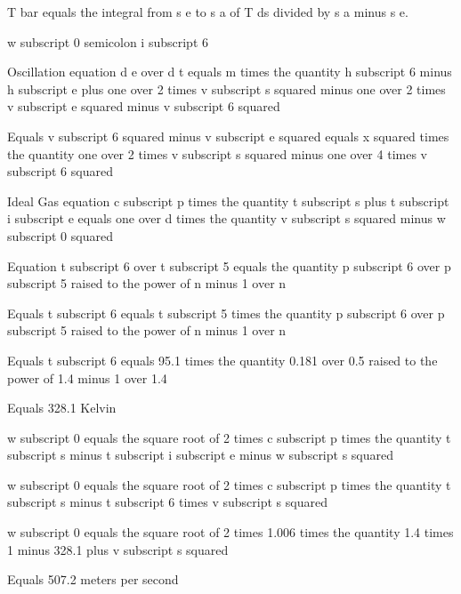 T bar equals the integral from s e to s a of T ds divided by s a minus s e.

w subscript 0 semicolon i subscript 6  

Oscillation equation  
d e over d t equals m times the quantity h subscript 6 minus h subscript e plus one over 2 times v subscript s squared minus one over 2 times v subscript e squared minus v subscript 6 squared  

Equals  
v subscript 6 squared minus v subscript e squared equals x squared times the quantity one over 2 times v subscript s squared minus one over 4 times v subscript 6 squared  

Ideal Gas equation  
c subscript p times the quantity t subscript s plus t subscript i subscript e equals one over d times the quantity v subscript s squared minus w subscript 0 squared  

Equation  
t subscript 6 over t subscript 5 equals the quantity p subscript 6 over p subscript 5 raised to the power of n minus 1 over n  

Equals  
t subscript 6 equals t subscript 5 times the quantity p subscript 6 over p subscript 5 raised to the power of n minus 1 over n  

Equals  
t subscript 6 equals 95.1 times the quantity 0.181 over 0.5 raised to the power of 1.4 minus 1 over 1.4  

Equals 328.1 Kelvin  

w subscript 0 equals the square root of 2 times c subscript p times the quantity t subscript s minus t subscript i subscript e minus w subscript s squared  

w subscript 0 equals the square root of 2 times c subscript p times the quantity t subscript s minus t subscript 6 times v subscript s squared  

w subscript 0 equals the square root of 2 times 1.006 times the quantity 1.4 times 1 minus 328.1 plus v subscript s squared  

Equals 507.2 meters per second